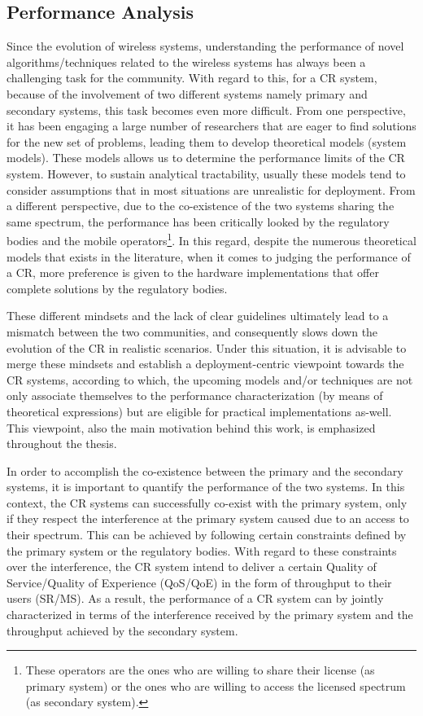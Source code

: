 \subsection{Performance Analysis}
Since the evolution of wireless systems, understanding the performance of novel algorithms/techniques related to the wireless systems has always been a challenging task for the community. With regard to this, for a CR system, because of the involvement of two different systems namely primary and secondary systems, this task becomes even more difficult. From one perspective, it has been engaging a large number of researchers that are eager to find solutions for the new set of problems, leading them to develop theoretical models (system models). These models allows us to determine the performance limits of the CR system. However, to sustain analytical tractability, usually these models tend to consider assumptions that in most situations are unrealistic for deployment.  %
 From a different perspective, due to the co-existence of the two systems sharing the same spectrum, the performance has been critically looked by the regulatory bodies and the mobile operators\footnote{These operators are the ones who are willing to share their license (as primary system) or the ones who are willing to access the licensed spectrum (as secondary system).}. In this regard, despite the numerous theoretical models that exists in the literature, when it comes to judging the performance of a CR, more preference is given to the hardware implementations that offer complete solutions by the regulatory bodies. 

These different mindsets and the lack of clear guidelines ultimately lead to a mismatch between the two communities, and consequently slows down the evolution of the CR in realistic scenarios. Under this situation, it is advisable to merge these mindsets and establish a deployment-centric viewpoint towards the CR systems, according to which, the upcoming models and/or techniques are not only associate themselves to the performance characterization (by means of theoretical expressions) but are eligible for practical implementations as-well. This viewpoint, also the main motivation behind this work, is emphasized throughout the thesis. 

In order to accomplish the co-existence between the primary and the secondary systems, it is important to quantify the performance of the two systems. In this context, the CR systems can successfully co-exist with the primary system, only if they respect the interference at the primary system caused due to an access to their spectrum. This can be achieved by following certain constraints defined by the primary system or the regulatory bodies. With regard to these constraints over the interference, the CR system intend to deliver a certain Quality of Service/Quality of Experience (QoS/QoE) in the form of throughput to their users (SR/MS). As a result, the performance of a CR system can by jointly characterized in terms of the interference received by the primary system and the throughput achieved by the secondary system. 

